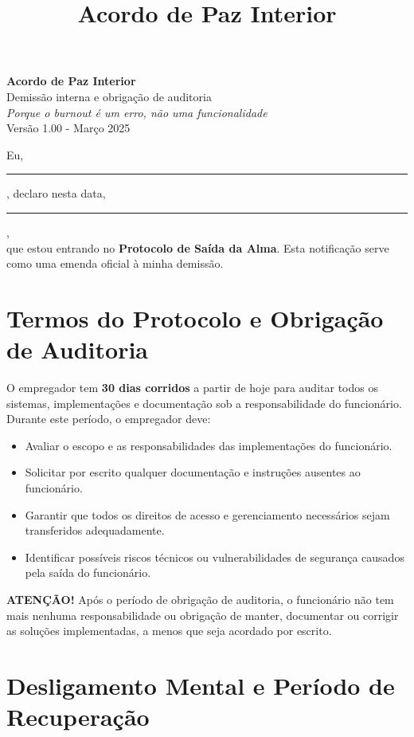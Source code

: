 \documentclass[a4paper,11pt]{article}
\title{Acordo de Paz Interior}
\date{}
\begin{document}
\pagestyle{empty}

\begin{center}
    {\LARGE \textbf{Acordo de Paz Interior}}\\[1em]
    {\large Demissão interna e obrigação de auditoria}\\[0.5em]
    \textit{Porque o burnout é um erro, não uma funcionalidade}\\[0.5em]
    {\small Versão 1.00 - Março 2025}
\end{center}

\vspace{2em}

Eu, \rule{7cm}{0.2pt}, declaro nesta data, \rule{4cm}{0.2pt},\\
que estou entrando no \textbf{Protocolo de Saída da Alma}. Esta notificação serve como uma emenda oficial à minha demissão.

\section*{Termos do Protocolo e Obrigação de Auditoria}

O empregador tem \textbf{30 dias corridos} a partir de hoje para auditar todos os sistemas, implementações e documentação sob a responsabilidade do funcionário. Durante este período, o empregador deve:

\begin{itemize}
    \item Avaliar o escopo e as responsabilidades das implementações do funcionário.
    \item Solicitar por escrito qualquer documentação e instruções ausentes ao funcionário.
    \item Garantir que todos os direitos de acesso e gerenciamento necessários sejam transferidos adequadamente.
    \item Identificar possíveis riscos técnicos ou vulnerabilidades de segurança causados pela saída do funcionário.
\end{itemize}

\textbf{ATENÇÃO!} Após o período de obrigação de auditoria, o funcionário não tem mais nenhuma responsabilidade ou obrigação de manter, documentar ou corrigir as soluções implementadas, a menos que seja acordado por escrito.

\section*{Desligamento Mental e Período de Recuperação}
\end{document}
